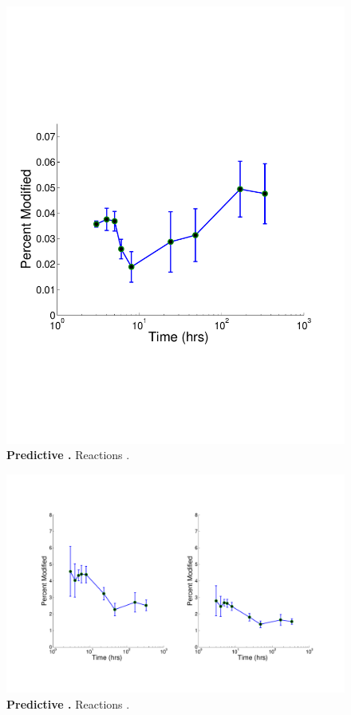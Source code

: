 \documentclass[12pt]{article}
\begin{document}
\clearpage
\begin{figure}[p]
\centerline{\includegraphics[width=5in]{Figures/Phosphorylations.pdf}}
\caption{\label{fig:carbon_network}\textbf{Predictive .} Reactions .}
\end{figure}


\clearpage
\begin{figure}[p]
\centerline{\includegraphics[width=8in]{Figures/Oxidations.pdf}}
\caption{\label{fig:nitrogen_network}\textbf{Predictive .} Reactions .}
\end{figure}
\end{document}
